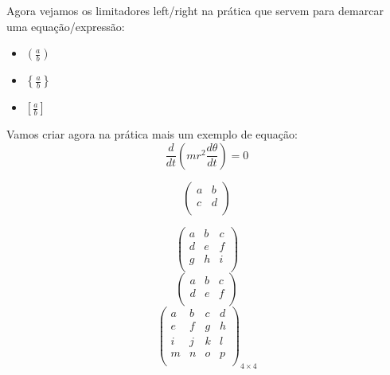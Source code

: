 \documentclass[a4paper, 12pt]{article}
\begin{document}
\vspace{0.5cm}
Agora vejamos os limitadores left/right na prática que servem para demarcar uma equação/expressão:
\begin{itemize}
\item $\left(\frac{a}{b}\right)$
\item $\left\lbrace\frac{a}{b}\right\rbrace$
\item $\left[\frac{a}{b}\right]$
\end{itemize}
\vspace{0.5cm}
Vamos criar agora na prática mais um exemplo de equação:
\vspace{0.3cm}
\begin{equation}
\frac{d}{dt}\left(mr^{2}\frac{d\theta}{dt}\right) = 0
\end{equation}

\vspace{0.5cm}

\begin{equation}
\left(
\begin{array}{lr}
	a & b \\
	c & d \\
\end{array}
\right)
\end{equation}

\vspace{0.5cm}

\begin{equation}
\left(
\begin{array}{lcr}
	a & b & c \\
	d & e & f \\
	g & h & i \\
\end{array}
\right)
\end{equation}
\vspace{0.5cm}
\begin{equation}
\begin{pmatrix}
a & b & c \\
d & e & f \\
\end{pmatrix}
\end{equation}
\vspace{0.5cm}
\begin{equation}
\begin{pmatrix}
a & b & c & d \\
e & f & g & h \\
i & j & k & l \\
m & n & o & p \\
\end{pmatrix}_{4 \times 4}
\end{equation}
\end{document}
